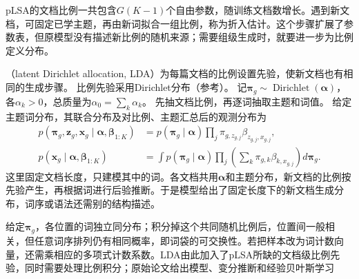 pLSA的文档比例一共包含$G(K-1)$个自由参数，随训练文档数增长。遇到新文档，可固定已学主题，再由新词拟合一组比例，称为折入估计。这个步骤扩展了参数表，但原模型没有描述新比例的随机来源；需要组级生成时，就要进一步为比例定义分布。

（latent Dirichlet allocation, LDA）为每篇文档的比例设置先验，使新文档也有相同的生成步骤。
比例先验采用Dirichlet分布（参考）。
记$\bm\pi_g\sim\operatorname{Dirichlet}(\bm\alpha)$，各$\alpha_k>0$，总质量为$\alpha_0=\sum_k\alpha_k$。
先抽文档比例，再逐词抽取主题和词值。
给定主题词分布，其联合分布及对比例、主题汇总后的观测分布为
\begin{equation}
  \label{eq:pgm-static-directed-lda}
  \begin{aligned}
    p(\bm{\pi}_g,\bm{z}_g,\bm{x}_g\mid
          \bm{\alpha},\bm{\beta}_{1:K})
      &=p(\bm{\pi}_g\mid\bm{\alpha})
         \prod_j\pi_{g,z_{g,j}}\beta_{z_{g,j},x_{g,j}},\\
    p(\bm{x}_g\mid\bm{\alpha},\bm{\beta}_{1:K})
      &=\int p(\bm{\pi}_g\mid\bm{\alpha})
          \prod_j\left(\sum_k
              \pi_{g,k}\beta_{k,x_{g,j}}\right)d\bm{\pi}_g.
  \end{aligned}
\end{equation}
这里固定文档长度，只建模其中的词。各文档共用$\bm\alpha$和主题分布，新文档的比例按先验产生，再根据词进行后验推断。于是模型给出了固定长度下的新文档生成分布，词序或语法还需别的结构描述。

给定$\bm\pi_g$，各位置的词独立同分布；积分掉这个共同随机比例后，位置间一般相关，但任意词序排列仍有相同概率，即词袋的可交换性。若把样本改为词计数向量，还需乘相应的多项式计数系数。LDA由此加入了pLSA所缺的文档级比例先验，同时需要处理比例积分；原始论文给出模型、变分推断和经验贝叶斯学习

